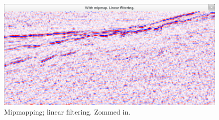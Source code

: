 \documentclass[a4paper, english, 12pt]{article}
\begin{document}
\begin{figure}[htp]
\centering
\includegraphics[clip=true, trim=10cm 5cm 10cm 6.5cm]{graphics/mip-on_linear_z0.1_x0.0_y0.7.png}
\caption{Mipmapping; linear filtering. Zommed in.}
\label{fig:mip_lin_zoomed-in}
\end{figure}


\end{document}
